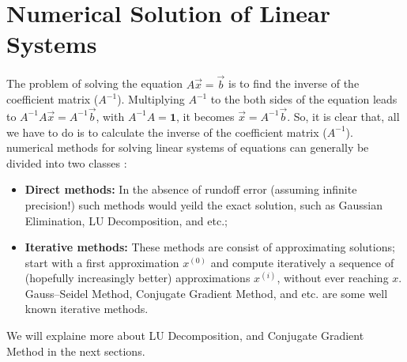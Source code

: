 \section{Numerical Solution of Linear Systems}
The problem of solving the equation $A \vec{x} = \vec{b} $ is to find the inverse of the coefficient matrix ($A^{-1}$). Multiplying $A^{-1}$ to the both sides of the equation leads to $A^{-1}A \vec{x}=A^{-1} \vec{b}$, with $A^{-1}A=\mathbf{1}$, it becomes $\vec{x} = A^{-1} \vec{b}$. So, it is clear that, all we have to do is to calculate the inverse of the coefficient matrix ($A^{-1}$).
\\
numerical methods for solving linear systems of equations can generally be divided into two classes \cite{allaire2008numerical} : 
\begin{itemize}
\item \textbf{Direct methods: } In the absence of rundoff error (assuming infinite precision!) such methods would yeild the exact solution, such as Gaussian Elimination, LU Decomposition, and etc.;
\item \textbf{Iterative methods: } These methods are consist of approximating solutions; start with a first approximation $x^{(0)}$ and compute iteratively a sequence of (hopefully increasingly better) approximations $x^{(i)}$, without ever reaching $x$. Gauss–Seidel Method, Conjugate Gradient Method, and etc. are some well known iterative methods.
\end{itemize}
We will explaine more about LU Decomposition, and Conjugate Gradient Method in the next sections.

